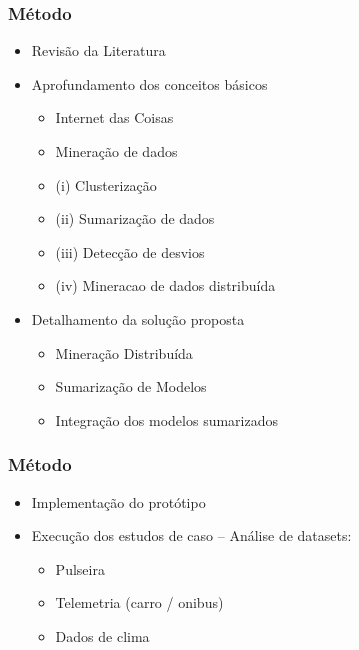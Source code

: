 \documentclass[hyperref={pdfpagelabels=false}]{beamer}
\begin{document}
\begin{frame}
	\frametitle{Método}
     \begin{itemize}
        	\item Revisão da Literatura
            \item Aprofundamento dos conceitos básicos \begin{itemize}
	            \item Internet das Coisas
  	         	\item Mineração de dados
            	\item (i) Clusterização
            	\item (ii) Sumarização de dados
            	\item (iii) Detecção de desvios
            	\item (iv) Mineracao de dados distribuída
            \end{itemize}
            \item Detalhamento da solução proposta \begin{itemize}
            	\item Mineração Distribuída
            	\item Sumarização de Modelos
            	\item Integração dos modelos sumarizados
            \end{itemize}
		\end{itemize}

\end{frame}

\begin{frame}
	\frametitle{Método}
     \begin{itemize}
            \item Implementação do protótipo
            \item Execução dos estudos de caso -- Análise de datasets:\begin{itemize}
            	\item Pulseira
            	\item Telemetria (carro / onibus)
            	\item Dados de clima
            \end{itemize}
		\end{itemize}

\end{frame}
\end{document}
